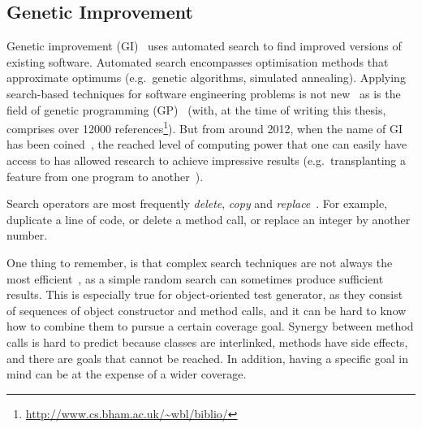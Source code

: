 \documentclass[a4paper,11pt]{sdm_internship}
\newcommand{\addref}[1]{\colorbox{TealBlue!100}{\textcolor{white}{\textbf{$[$\ifx&#1&\ \else#1\fi$]$}}}}
\theoremstyle{definition}
\begin{document}
\subsection{Genetic Improvement}%
\label{ssec:genetic_improvement}
Genetic improvement (GI)~\cite{petke2017genetic} uses automated search to find improved versions of existing software.
Automated search encompasses optimisation methods that approximate optimums (e.g.\ genetic algorithms, simulated annealing).
Applying search-based techniques for software engineering problems is not new~\cite{mcminn2011search} as is the field of genetic programming (GP)~\cite{koza1994genetic} (with, at the time of writing this thesis, comprises over 12000 references\footnote{\url{http://www.cs.bham.ac.uk/~wbl/biblio/}}).
But from around 2012, when the name of GI has been coined~\cite{harman2012gismoe}, the reached level of computing power that one can easily have access to has allowed research to achieve impressive results (e.g.\ transplanting a feature from one program to another~\cite{barr2015automated}).



Search operators are most frequently \emph{delete}, \emph{copy} and \emph{replace}~\cite{petke2017new}.
For example, duplicate a line of code, or delete a method call, or replace an integer by another number.

One thing to remember, is that complex search techniques are not always the most efficient~\cite{shamshiri2017random}, as a simple random search can sometimes produce sufficient results.
This is especially true for object-oriented test generator, as they consist of sequences of object constructor and method calls, and it can be hard to know how to combine them to pursue a certain coverage goal.
Synergy between method calls is hard to predict because classes are interlinked, methods have side effects, and there are goals that cannot be reached.
In addition, having a specific goal in mind can be at the expense of a wider coverage.

\end{document}
